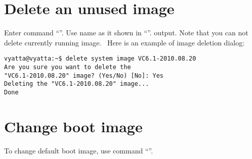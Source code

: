 \section{Delete an unused image}
\solution 
Enter command ``''. Use name as it shown in ``''.
output. Note that you can not delete currently running image. \ 
Here is an example of image deletion dialog:
\begin{verbatim}
vyatta@vyatta:~$ delete system image VC6.1-2010.08.20 
Are you sure you want to delete the
"VC6.1-2010.08.20" image? (Yes/No) [No]: Yes
Deleting the "VC6.1-2010.08.20" image...
Done
\end{verbatim}

\section{Change boot image}
\solution
To change default boot image, use command ``''.
